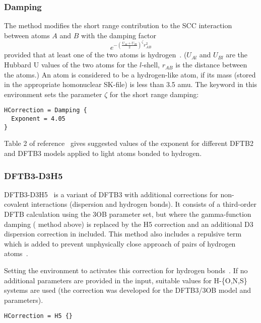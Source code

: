 \subsubsection{Damping}

The  method modifies the short range contribution to the SCC
interaction between atoms $A$ and $B$ with the damping factor
\begin{equation*}
  e^{-\left(\frac{U_{Al} + U_{Bl}}{2}\right)^\zeta r_{AB}^2}
\end{equation*}
provided that at least one of the two atoms is
hydrogen~\cite{gauss-jctc-7-931,yang-JPCA-111-10861}. ($U_{Al}$ and $U_{Bl}$ are
the Hubbard U values of the two atoms for the $l$-shell, $r_{AB}$ is the
distance between the atoms.) An atom is considered to be a hydrogen-like atom,
if its mass (stored in the appropriate homonuclear SK-file) is less than 3.5
amu.  The  keyword in this environment sets the parameter $\zeta$
for the short range damping:
\begin{verbatim}
HCorrection = Damping {
  Exponent = 4.05
}
\end{verbatim}
Table 2 of reference~\cite{gauss-jctc-7-931} gives suggested values of the
exponent for different DFTB2 and DFTB3 models applied to light atoms bonded to
hydrogen.

\subsubsection{DFTB3-D3H5}

DFTB3-D3H5~\cite{rezac-jctc-13-2017} is a variant of DFTB3 with additional
corrections for non-covalent interactions (dispersion and hydrogen bonds).  It
consists of a third-order DFTB calculation using the 3OB parameter set, but
where the gamma-function damping ( method above) is replaced by the
H5 correction and an additional D3 dispersion correction in included. This
method also includes a repulsive term which is added to prevent unphysically
close approach of pairs of hydrogen atoms~\cite{rezac-jctc-8-2012}.

Setting the  environment to  activates this
correction for hydrogen bonds~\cite{rezac-jctc-13-2017}. If no additional
parameters are provided in the input, suitable values for H-\{O,N,S\} systems
are used (the correction was developed for the DFTB3/3OB model and parameters).
\begin{verbatim}
HCorrection = H5 {}
\end{verbatim}


